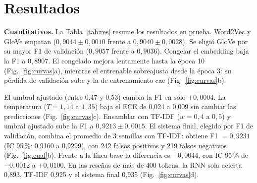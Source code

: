 \documentclass[letterpaper, 10 pt, conference]{ieeeconf}
\begin{document}
\section{Resultados}

\textbf{Cuantitativos.} La Tabla~\ref{tab:res} resume los resultados en prueba. Word2Vec y GloVe empatan ($0{,}9044\pm0{,}0010$ frente a $0{,}9040\pm0{,}0028$). Se eligió GloVe por su mayor F1 de validación ($0{,}9057$ frente a $0{,}9036$). Congelar el embedding baja la F1 a $0{,}8907$. El congelado mejora lentamente hasta la época 10 (Fig.~\ref{fig:curvas}a), mientras el entrenable sobreajusta desde la época 3: su pérdida de validación sube y la de entrenamiento cae (Fig.~\ref{fig:curvas}b).

\begin{table}[t]
\centering
\caption{Resultados en prueba (5\,958 reseñas); (3s): media $\pm$ desv. est. de 3 semillas. 200 tokens salvo v1.}
\label{tab:res}
\setlength{\tabcolsep}{2.4pt}
\footnotesize
{}
\end{table}

El umbral ajustado (entre 0,47 y 0,53) cambia la F1 en solo $+0{,}0004$. La temperatura ($T=1{,}14$ a $1{,}35$) baja el ECE de 0,024 a 0,009 sin cambiar las predicciones (Fig.~\ref{fig:curvas}c). Ensamblar con TF-IDF ($w=0{,}4$ a $0{,}5$) y umbral ajustado sube la F1 a $0{,}9213\pm0{,}0015$. El sistema final, elegido por F1 de validación, combina el promedio de 3 semillas con TF-IDF: obtiene F1 $=0{,}9231$ (IC 95\,\%: 0,9160 a 0,9299), con 242 falsos positivos y 219 falsos negativos (Fig.~\ref{fig:cual}b). Frente a la línea base la diferencia es $+0{,}0044$, con IC 95\,\% de $-0{,}0012$ a $+0{,}0100$. En las reseñas de más de 400 tokens, la RNN sola acierta 0,893, TF-IDF 0,925 y el sistema final 0,935 (Fig.~\ref{fig:curvas}d).
\end{document}
